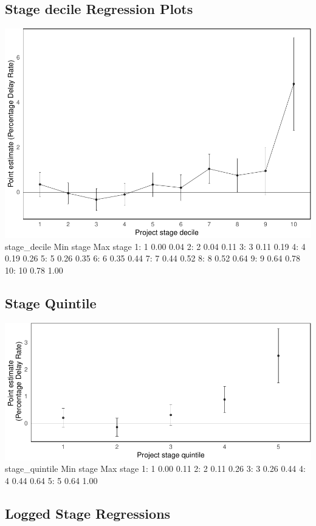 \documentclass[
]{article}
\begin{document}
\hypertarget{stage-decile-regression-plots}{%
\subsection{Stage decile Regression
Plots}\label{stage-decile-regression-plots}}

\includegraphics{qp_first_pc_delay-2_files/figure-latex/stage_decile-1.pdf}
stage\_decile Min stage Max stage 1: 1 0.00 0.04 2: 2 0.04 0.11 3: 3
0.11 0.19 4: 4 0.19 0.26 5: 5 0.26 0.35 6: 6 0.35 0.44 7: 7 0.44 0.52 8:
8 0.52 0.64 9: 9 0.64 0.78 10: 10 0.78 1.00

\hypertarget{stage-quintile}{%
\subsection{Stage Quintile}\label{stage-quintile}}

\includegraphics{qp_first_pc_delay-2_files/figure-latex/stage_quintile-1.pdf}
stage\_quintile Min stage Max stage 1: 1 0.00 0.11 2: 2 0.11 0.26 3: 3
0.26 0.44 4: 4 0.44 0.64 5: 5 0.64 1.00

\hypertarget{logged-stage-regressions}{%
\subsection{Logged Stage Regressions}\label{logged-stage-regressions}}
\end{document}
